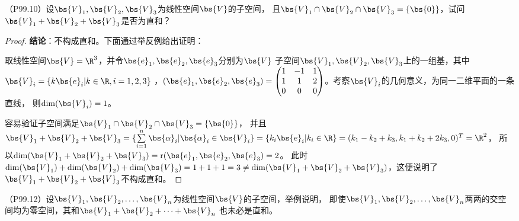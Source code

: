 \documentclass[12pt, a4paper, oneside, UTF8]{ctexbook}
\begin{document}
\begin{question}
    \label{no zhihe}
    （P99.10）设$\bs{V}_1,\bs{V}_2,\bs{V}_3$为线性空间$\bs{V}$的子空间，
    且$\bs{V}_1 \cap \bs{V}_2 \cap \bs{V}_3=\{\bs{0}\}$，试问$\bs{V}_1+\bs{V}_2+\bs{V}_3$是否为直和？    
\end{question}

\begin{proof}
    \textbf{结论}：不构成直和。下面通过举反例给出证明：

    取线性空间$\bs{V}=\R^3$，并令$\bs{e}_1,\bs{e}_2,\bs{e}_3$分别为$\bs{V}$
    子空间$\bs{V}_1,\bs{V}_2,\bs{V}_3$上的一组基，其中$\bs{V}_i=\{k\bs{e}_i|k\in\R,i=1,2,3\}$
    ，$(\bs{e}_1,\bs{e}_2,\bs{e}_3)=\begin{pmatrix}
        1 & -1 &1 \\
        1 & 1 &2 \\
        0 & 0 & 0
    \end{pmatrix}$。考察$\bs{V}_i$的几何意义，为同一二维平面的一条直线，
    则$\mathrm{dim}(\bs{V}_i)=1$。
    
    容易验证子空间满足$\bs{V}_1 \cap \bs{V}_2 \cap \bs{V}_3=\{\bs{0}\}$，
    并且$\bs{V}_1+\bs{V}_2+\bs{V}_3=\{\sum\limits_{i=1}^n\bs{\alpha}_i|\bs{\alpha}_i \in \bs{V}_i\}
    =\{k_i\bs{e}_i|k_i \in \R \}=(k_1-k_2+k_3,k_1+k_2+2k_3,0)^T=\R^2$，
    所以$\mathrm{dim}(\bs{V}_1+\bs{V}_2+\bs{V}_3)=\mathrm{r}(\bs{e}_1,\bs{e}_2,\bs{e}_3)=2$。
    此时$\mathrm{dim}(\bs{V}_1)+\mathrm{dim}(\bs{V}_2)+\mathrm{dim}(\bs{V}_3)=1+1+1=3 \neq \mathrm{dim}(\bs{V}_1+\bs{V}_2+\bs{V}_3)$，这便说明了
    $\bs{V}_1+\bs{V}_2+\bs{V}_3$不构成直和。

\end{proof}

\begin{question}
    （P99.12）设$\bs{V}_1,\bs{V}_2,\ldots,\bs{V}_n$为线性空间$\bs{V}$的子空间，举例说明，
    即使$\bs{V}_1,\bs{V}_2,\ldots,\bs{V}_n$两两的交空间均为零空间，其和$\bs{V}_1+\bs{V}_2+\cdots+\bs{V}_n$
    也未必是直和。
\end{question}
\end{document}
